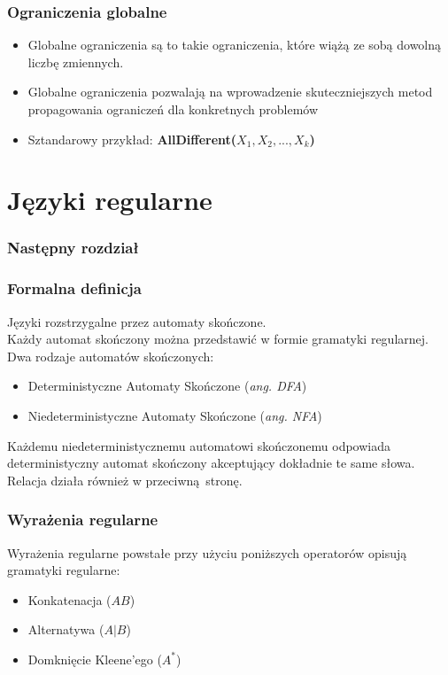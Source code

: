 \documentclass{beamer}
\begin{document}
    \begin{frame}
        \frametitle{Ograniczenia globalne}
        \begin{itemize}
            \item Globalne ograniczenia są to takie ograniczenia, które wiążą ze sobą dowolną liczbę
                  zmiennych.
            \item Globalne ograniczenia pozwalają na wprowadzenie skuteczniejszych metod
                  propagowania ograniczeń dla konkretnych problemów
            \item Sztandarowy przykład: \bf{AllDifferent($X_1, X_2, ... , X_k$)}
        \end{itemize}
    \end{frame}


    \section{Języki regularne}
    \begin{frame}
    	\frametitle{Następny rozdział}
        \tableofcontents[currentsection]
    \end{frame}
    \begin{frame}
        \frametitle{Formalna definicja}
        Języki rozstrzygalne przez automaty skończone. \\
        Każdy automat skończony można przedstawić w formie gramatyki regularnej. \\
        Dwa rodzaje automatów skończonych:
        \begin{itemize}
            \item Deterministyczne Automaty Skończone (\textit{ang. DFA})
            \item Niedeterministyczne Automaty Skończone (\textit{ang. NFA})
        \end{itemize}
        Każdemu niedeterministycznemu automatowi skończonemu odpowiada deterministyczny automat
        skończony akceptujący dokładnie te same słowa. Relacja działa również w przeciwną stronę.
    \end{frame}
    \begin{frame}
        \frametitle{Wyrażenia regularne}
        Wyrażenia regularne powstałe przy użyciu poniższych operatorów opisują gramatyki regularne:
        \begin{itemize}
            \item Konkatenacja (\textit{$AB$})
            \item Alternatywa (\textit{$A|B$})
            \item Domknięcie Kleene'ego (\textit{$A^*$})
        \end{itemize}
    \end{frame}
\end{document}

